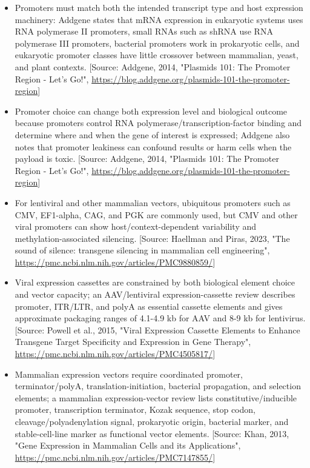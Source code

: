 \documentclass[11pt]{report}
\begin{document}
\begin{itemize}
\item Promoters must match both the intended transcript type and host expression machinery: Addgene states that mRNA expression in eukaryotic systems uses RNA polymerase II promoters, small RNAs such as shRNA use RNA polymerase III promoters, bacterial promoters work in prokaryotic cells, and eukaryotic promoter classes have little crossover between mammalian, yeast, and plant contexts. [Source: Addgene, 2014, "Plasmids 101: The Promoter Region - Let's Go!", \url{https://blog.addgene.org/plasmids-101-the-promoter-region}]
\item Promoter choice can change both expression level and biological outcome because promoters control RNA polymerase/transcription-factor binding and determine where and when the gene of interest is expressed; Addgene also notes that promoter leakiness can confound results or harm cells when the payload is toxic. [Source: Addgene, 2014, "Plasmids 101: The Promoter Region - Let's Go!", \url{https://blog.addgene.org/plasmids-101-the-promoter-region}]
\item For lentiviral and other mammalian vectors, ubiquitous promoters such as CMV, EF1-alpha, CAG, and PGK are commonly used, but CMV and other viral promoters can show host/context-dependent variability and methylation-associated silencing. [Source: Haellman and Piras, 2023, "The sound of silence: transgene silencing in mammalian cell engineering", \url{https://pmc.ncbi.nlm.nih.gov/articles/PMC9880859/}]
\item Viral expression cassettes are constrained by both biological element choice and vector capacity; an AAV/lentiviral expression-cassette review describes promoter, ITR/LTR, and polyA as essential cassette elements and gives approximate packaging ranges of 4.1-4.9 kb for AAV and 8-9 kb for lentivirus. [Source: Powell et al., 2015, "Viral Expression Cassette Elements to Enhance Transgene Target Specificity and Expression in Gene Therapy", \url{https://pmc.ncbi.nlm.nih.gov/articles/PMC4505817/}]
\item Mammalian expression vectors require coordinated promoter, terminator/polyA, translation-initiation, bacterial propagation, and selection elements; a mammalian expression-vector review lists constitutive/inducible promoter, transcription terminator, Kozak sequence, stop codon, cleavage/polyadenylation signal, prokaryotic origin, bacterial marker, and stable-cell-line marker as functional vector elements. [Source: Khan, 2013, "Gene Expression in Mammalian Cells and its Applications", \url{https://pmc.ncbi.nlm.nih.gov/articles/PMC7147855/}]

\end{itemize}
\end{document}
